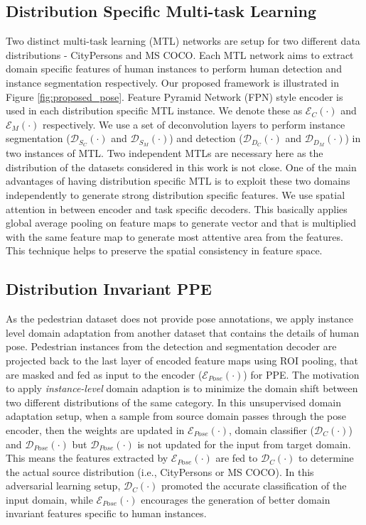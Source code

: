 \documentclass[a4paper,11pt]{article}
\begin{document}
\subsection{Distribution Specific Multi-task Learning}
Two distinct multi-task learning (MTL) networks are setup for two different data distributions - CityPersons and MS COCO. Each MTL network aims to extract domain specific features of human instances to perform human detection and instance segmentation respectively. Our proposed framework is illustrated in Figure \ref{fig:proposed_pose}. Feature Pyramid Network (FPN) style encoder is used in each distribution specific MTL instance. We denote these as $\mathcal{E}_{C}(\cdot)$ and $\mathcal{E}_{M}(\cdot)$ respectively. We use a set of deconvolution layers to perform instance segmentation ($\mathcal{D}_{S_C}(\cdot)$ and $\mathcal{D}_{S_M}(\cdot)$) and detection  ($\mathcal{D}_{D_C}(\cdot)$ and $\mathcal{D}_{D_M}(\cdot)$) in two instances of MTL. Two independent MTLs are necessary here as the distribution of the datasets considered in this work is not close. One of the main advantages of having distribution specific MTL is to exploit these two domains independently to generate strong distribution specific features. We use spatial attention in between encoder and task specific decoders. This basically applies global average pooling on feature maps to generate vector and that is multiplied with the same feature map to generate most attentive area from the features. This technique helps to preserve the spatial consistency in feature space.

\subsection{Distribution Invariant PPE}
As the pedestrian dataset does not provide pose annotations, we apply instance level domain adaptation from another dataset that contains the details of human pose. Pedestrian instances from the detection and segmentation decoder are projected back to the last layer of encoded feature maps using ROI pooling, that are masked and fed as input to the encoder ($\mathcal{E}_{Pose}(\cdot)$) for PPE. The motivation to apply \textit{instance-level} domain adaption is to minimize the domain shift between two different distributions of the same category.  In this unsupervised domain adaptation setup, when a sample from source domain passes through the pose encoder, then the weights are updated in $\mathcal{E}_{Pose}(\cdot)$, domain classifier ($\mathcal{D}_{C}(\cdot)$) and $\mathcal{D}_{Pose}(\cdot)$ but $\mathcal{D}_{Pose}(\cdot)$ is not updated for the input from target domain. This means the features extracted by $\mathcal{E}_{Pose}(\cdot)$ are fed to $\mathcal{D}_{C}(\cdot)$ to determine the actual source distribution (i.e., CityPersons or MS COCO). In this adversarial learning setup, $\mathcal{D}_{C}(\cdot)$ promoted the accurate classification of the input domain, while $\mathcal{E}_{Pose}(\cdot)$ encourages the generation of better domain invariant features specific to human instances.
\end{document}
